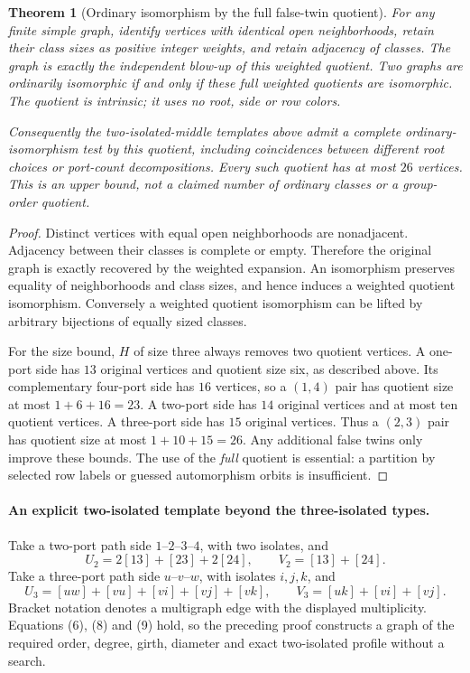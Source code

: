 \documentclass[11pt]{article}
\newtheorem{theorem}{Theorem}
\begin{document}
\begin{theorem}[Ordinary isomorphism by the full false-twin quotient]
\label{twins}
For any finite simple graph, identify vertices with identical open
neighborhoods, retain their class sizes as positive integer weights,
and retain adjacency of classes. The graph is exactly the independent
blow-up of this weighted quotient. Two graphs are ordinarily
isomorphic if and only if these full weighted quotients are isomorphic.
The quotient is intrinsic; it uses no root, side or row colors.

Consequently the two-isolated-middle templates above admit a complete
ordinary-isomorphism test by this quotient, including coincidences
between different root choices or port-count decompositions. Every
such quotient has at most $26$ vertices. This is an upper bound,
not a claimed number of ordinary classes or a group-order quotient.
\end{theorem}
\begin{proof}
Distinct vertices with equal open neighborhoods are nonadjacent.
Adjacency between their classes is complete or empty. Therefore
the original graph is exactly recovered by the weighted expansion.
An isomorphism preserves equality of neighborhoods and class sizes,
and hence induces a weighted quotient isomorphism. Conversely a
weighted quotient isomorphism can be lifted by arbitrary bijections
of equally sized classes.

For the size bound, $H$ of size three always removes two quotient
vertices. A one-port side has $13$ original vertices and quotient
size six, as described above. Its complementary four-port side
has $16$ vertices, so a $(1,4)$ pair has quotient size at most
$1+6+16=23$. A two-port side has $14$ original vertices and at
most ten quotient vertices. A three-port side has $15$ original
vertices. Thus a $(2,3)$ pair has quotient size at most
$1+10+15=26$. Any additional false twins only improve these bounds.
The use of the \emph{full} quotient is essential: a partition by
selected row labels or guessed automorphism orbits is insufficient.
\end{proof}

\paragraph{An explicit two-isolated template beyond the three-isolated types.}
Take a two-port path side $1$--$2$--$3$--$4$, with two isolates,
and
\[
 U_2=2[13]+[23]+2[24],\qquad V_2=[13]+[24].
\]
Take a three-port path side $u$--$v$--$w$, with isolates $i,j,k$,
and
\[
 U_3=[uw]+[vu]+[vi]+[vj]+[vk],\qquad
 V_3=[uk]+[vi]+[vj].                               \tag{13}
\]
Bracket notation denotes a multigraph edge with the displayed
multiplicity. Equations (6), (8) and (9) hold, so the preceding
proof constructs a graph of the required order, degree, girth,
diameter and exact two-isolated profile without a search.
\end{document}
